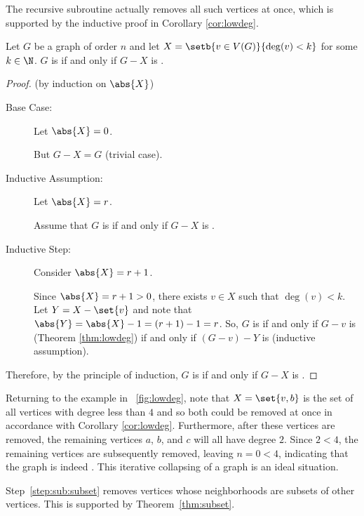 The recursive subroutine actually removes all such vertices at once, which is supported by the inductive proof in
Corollary \ref{cor:lowdeg}.

\begin{corollary}
  \label{cor:lowdeg}
  Let \(G\) be a graph of order \(n\) and let \(X=\setb{v\in V(G)}{\deg(v)<k}\) for some \(k\in\N\).  \(G\) is
   if and only if \(G-X\) is .
\end{corollary}

\begin{proof}
  (by induction on \(\abs{X}\))
  \begin{description}
  \item[Base Case:] Let \(\abs{X}=0\).

    But \(G-X=G\) (trivial case).

  \item[Inductive Assumption:] Let \(\abs{X}=r\).

    Assume that \(G\) is  if and only if \(G-X\) is .

  \item[Inductive Step:] Consider \(\abs{X}=r+1\).
    
    Since \(\abs{X}=r+1>0\), there exists \(v\in X\) such that \(\deg(v)<k\).  Let \(Y=X-\set{v}\) and note that
    \(\abs{Y}=\abs{X}-1=(r+1)-1=r\).  So, \(G\) is  if and only if \(G-v\) is  (Theorem
    \ref{thm:lowdeg}) if and only if \((G-v)-Y\) is  (inductive assumption).
  \end{description}

  Therefore, by the principle of induction, \(G\) is  if and only if \(G-X\) is .
\end{proof}

Returning to the example in \figurename~\ref{fig:lowdeg}, note that \(X=\set{v,b}\) is the set of all vertices with
degree less than \(4\) and so both could be removed at once in accordance with Corollary \ref{cor:lowdeg}.
Furthermore, after these vertices are removed, the remaining vertices \(a\), \(b\), and \(c\) will all have degree
\(2\).  Since \(2<4\), the remaining vertices are subsequently removed, leaving \(n=0<4\), indicating that the
graph is indeed .  This iterative collapsing of a graph is an ideal situation.

Step~\ref{step:sub:subset} removes vertices whose neighborhoods are subsets of other vertices.  This is supported
by Theorem~\ref{thm:subset}.

